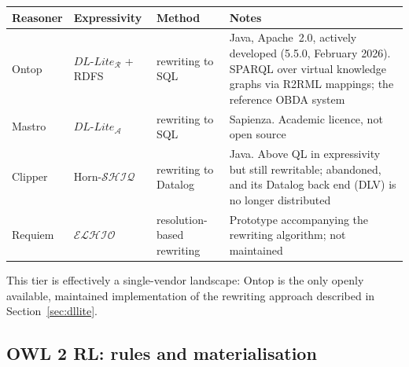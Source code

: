 \documentclass[11pt,a4paper]{article}
\newcommand{\dl}[1]{\ensuremath{\mathcal{#1}}}
\newcommand{\dllite}[1]{\ensuremath{\textit{DL-Lite}_{#1}}}
\begin{document}
\begin{table}[h]
\centering
\footnotesize
\begin{tabular}{@{}lllp{4.5cm}@{}}
\toprule
\textbf{Reasoner} & \textbf{Expressivity} & \textbf{Method} & \textbf{Notes}\\
\midrule
Ontop & $\dllite{\mathcal{R}}$ + RDFS & rewriting to SQL
  & Java, Apache~2.0, actively developed (5.5.0, February 2026). SPARQL over
    virtual knowledge graphs via R2RML mappings; the reference OBDA system\\
Mastro & $\dllite{\mathcal{A}}$ & rewriting to SQL
  & Sapienza. Academic licence, not open source\\
Clipper & Horn-$\dl{SHIQ}$ & rewriting to Datalog
  & Java. Above QL in expressivity but still rewritable; abandoned, and its
    Datalog back end (DLV) is no longer distributed\\
Requiem & $\dl{ELHIO}$ & resolution-based rewriting
  & Prototype accompanying the rewriting algorithm; not maintained\\
\bottomrule
\end{tabular}
\end{table}

\noindent
This tier is effectively a single-vendor landscape: Ontop is the only openly
available, maintained implementation of the rewriting approach described in
Section~\ref{sec:dllite}.

\subsection*{OWL 2 RL: rules and materialisation}
\end{document}

